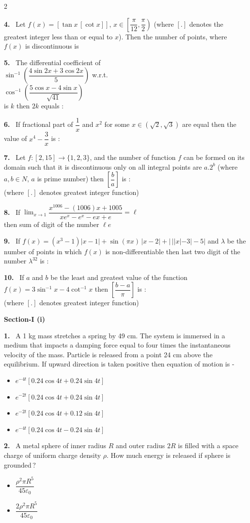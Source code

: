 \documentclass[10pt]{extarticle}
\newcommand{\papersec}[1]{\par\bigskip{\centering\Large\bfseries PAPER-#1\par}\medskip}
\newcommand{\partsec}[2]{\par\medskip\noindent{\large\bfseries PART-#1: #2}\par\smallskip}
\newcommand{\sect}[1]{\par\smallskip\noindent\textbf{#1}\par}
\newcommand{\qn}[1]{\par\smallskip\noindent\textbf{#1.}~}
\newenvironment{qoptions}{\begin{itemize}[leftmargin=1.8em,itemsep=1pt,topsep=2pt,label={}]}{\end{itemize}}
\newcommand{\opt}[2]{\item[(#1)] #2}
\begin{document}
\begin{multicols}{2}
\qn{4} Let $f(x)=[\tan x\,[\cot x]]$, $x\in\left[\dfrac\pi{12},\dfrac\pi2\right)$ (where $[.]$ denotes the greatest integer less than or equal to $x$). Then the number of points, where $f(x)$ is discontinuous is
\qn{5} The differential coefficient of\\ {\small$\sin^{-1}\left(\dfrac{4\sin2x+3\cos2x}{5}\right)$} w.r.t.\\ {\small$\cos^{-1}\left(\dfrac{5\cos x-4\sin x}{\sqrt{41}}\right)$}\\ is $k$ then $2k$ equals :
\qn{6} If fractional part of $\dfrac1x$ and $x^2$ for some $x\in(\sqrt2,\sqrt3)$ are equal then the value of $x^4-\dfrac3x$ is :
\qn{7} Let $f:[2,15]\to\{1,2,3\}$, and the number of function $f$ can be formed on its domain such that it is discontinuous only on all integral points are $a.2^b$ (where $a,b\in N$, $a$ is prime number) then $\left[\dfrac ba\right]$ is :\\
(where $[.]$ denotes greatest integer function)
\qn{8} If $\displaystyle\lim_{x\to1}\dfrac{x^{1006}-(1006)x+1005}{xe^x-e^x-ex+e}=\ell$\\
then sum of digit of the number $\ell e$
\qn{9} If $f(x)=\left(x^3-1\right)|x-1|+\sin(\pi x)\,|x-2|+\bigl|\,||x|-3|-5\bigr|$ and $\lambda$ be the number of points in which $f(x)$ is non-differentiable then last two digit of the number $\lambda^{32}$ is :
\qn{10} If $a$ and $b$ be the least and greatest value of the function $f(x)=3\sin^{-1}x-4\cot^{-1}x$ then $\left[\dfrac{b-a}{\pi}\right]$ is :\\
(where $[.]$ denotes greatest integer function)
\papersec{2}
\partsec{1}{PHYSICS}
\sect{Section-I (i)}
\qn{1} A 1 kg mass stretches a spring by 49 cm. The system is immersed in a medium that impacts a damping force equal to four times the instantaneous velocity of the mass. Particle is released from a point 24 cm above the equilibrium. If upward direction is taken positive then equation of motion is -
\begin{qoptions}
\opt{A}{$e^{-4t}\left[0.24\cos4t+0.24\sin4t\right]$}
\opt{B}{$e^{-2t}\left[0.24\cos4t+0.24\sin4t\right]$}
\opt{C}{$e^{-2t}\left[0.24\cos4t+0.12\sin4t\right]$}
\opt{D}{$e^{-4t}\left[0.24\cos4t-0.24\sin4t\right]$}
\end{qoptions}
\qn{2} A metal sphere of inner radius $R$ and outer radius $2R$ is filled with a space charge of uniform charge density $\rho$. How much energy is released if sphere is grounded\,?
\begin{qoptions}
\opt{A}{$\dfrac{\rho^2\pi R^5}{45\varepsilon_0}$}
\opt{B}{$\dfrac{2\rho^2\pi R^5}{45\varepsilon_0}$}

\end{qoptions}
\end{multicols}
\end{document}
